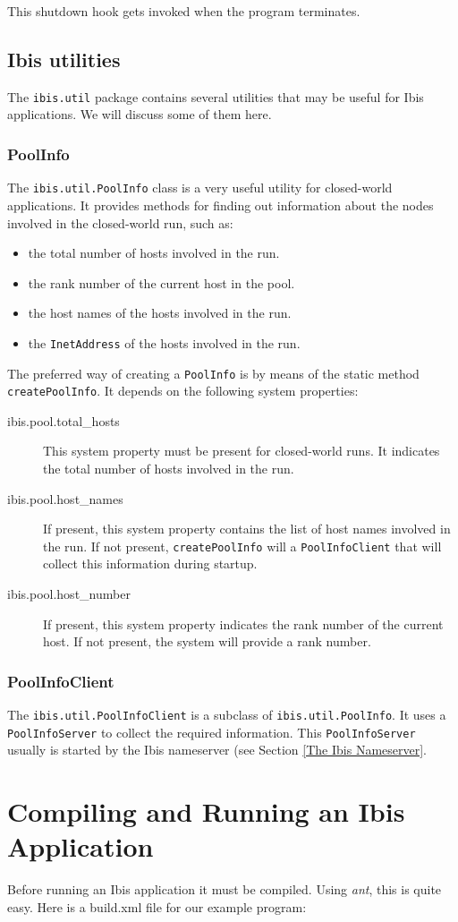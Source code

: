 \documentclass[10pt]{article}
\newcommand{\mysection}[1]{\section{#1}\label{#1}}
\newcommand{\mysubsection}[1]{\subsection{#1}\label{#1}}
\newcommand{\mysubsubsection}[1]{\subsubsection{#1}\label{#1}}
\begin{document}
This shutdown hook gets invoked when the program terminates.

\mysubsection{Ibis utilities}

The \verb+ibis.util+ package contains several utilities that may be
useful for Ibis applications. We will discuss some of them here.

\mysubsubsection{PoolInfo}

The \verb+ibis.util.PoolInfo+ class is a very useful utility for
closed-world applications.
It provides methods for finding out information about the nodes
involved in the closed-world run, such as:
\begin{itemize}
\item
the total number of hosts involved in the run.
\item
the rank number of the current host in the pool.
\item
the host names of the hosts involved in the run.
\item
the \verb+InetAddress+ of the hosts involved in the run.
\end{itemize}

The preferred way of creating a \verb+PoolInfo+ is by means of the
static method \verb+createPoolInfo+.
It depends on the following system properties:
\begin{description}
\item[ibis.pool.total\_hosts]
This system property must be present for closed-world runs.
It indicates the total number of hosts involved in the run.
\item[ibis.pool.host\_names]
If present, this system property contains the list of host names
involved in the run.
If not present, \verb+createPoolInfo+ will a \verb+PoolInfoClient+
that will collect this information during startup.
\item[ibis.pool.host\_number]
If present, this system property indicates the rank number of the
current host. If not present, the system will provide a rank number.
\end{description}

\mysubsubsection{PoolInfoClient}

The \verb+ibis.util.PoolInfoClient+ is a subclass of
\verb+ibis.util.PoolInfo+.
It uses a \verb+PoolInfoServer+ to collect the required information.
This \verb+PoolInfoServer+ usually is started by the Ibis nameserver
(see Section \ref{The Ibis Nameserver}.

\mysection{Compiling and Running an Ibis Application}

Before running an Ibis application it must be compiled.
Using \emph{ant}, this is quite easy. Here is a build.xml file for
our example program:
\end{document}
